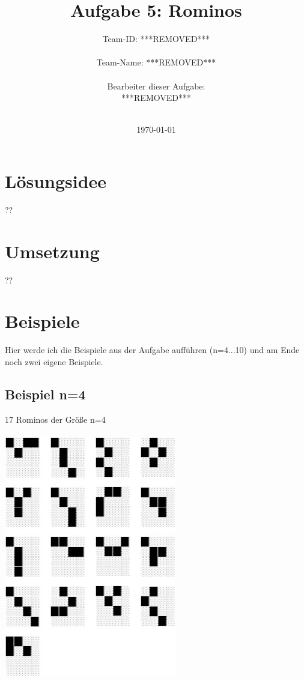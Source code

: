 \documentclass[a4paper,10pt]{scrartcl}
\title{Aufgabe 5: Rominos}
\author{Team-ID: ***REMOVED*** \\\\
	    Team-Name: ***REMOVED*** \\\\
	    Bearbeiter dieser Aufgabe: \\
	    ***REMOVED***\\\\}
\date{\today}
\begin{document}
\maketitle
\tableofcontents

\section{Lösungsidee}
??

\section{Umsetzung}
??

\section{Beispiele}
Hier werde ich die Beispiele aus der Aufgabe aufführen (n=4...10) und am Ende noch zwei eigene Beispiele.

\subsection{Beispiel n=4}
17 Rominos der Größe n=4 \\\\
\includegraphics{4.jpg}
\end{document}
